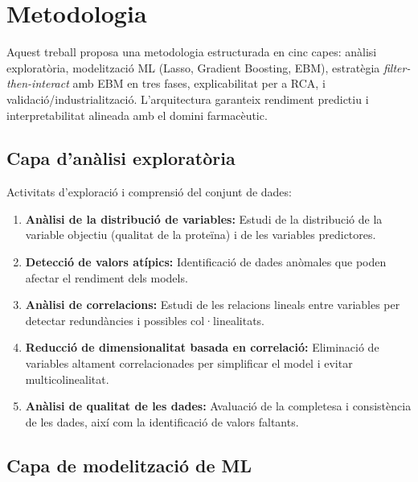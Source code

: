 
\section{Metodologia}
\label{sec:metodologia}

Aquest treball proposa una metodologia estructurada en cinc capes: anàlisi exploratòria, modelització ML (Lasso, Gradient Boosting, EBM), estratègia \emph{filter-then-interact} amb EBM en tres fases, explicabilitat per a RCA, i validació/industrialització. L'arquitectura garanteix rendiment predictiu i interpretabilitat alineada amb el domini farmacèutic.

\subsection{Capa d'anàlisi exploratòria}
\label{subsec:capa_analisi_exploratoria}

Activitats d'exploració i comprensió del conjunt de dades:

\begin{enumerate}
    \item \textbf{Anàlisi de la distribució de variables:} Estudi de la distribució de la variable objectiu (qualitat de la proteïna) i de les variables predictores.
    \item \textbf{Detecció de valors atípics:} Identificació de dades anòmales que poden afectar el rendiment dels models.
    \item \textbf{Anàlisi de correlacions:} Estudi de les relacions lineals entre variables per detectar redundàncies i possibles col·linealitats.
    \item \textbf{Reducció de dimensionalitat basada en correlació:} Eliminació de variables altament correlacionades per simplificar el model i evitar multicolinealitat.
    \item \textbf{Anàlisi de qualitat de les dades:} Avaluació de la completesa i consistència de les dades, així com la identificació de valors faltants.
\end{enumerate}

\subsection{Capa de modelització de ML}
\label{subsec:capa_modelitzacio_ml}


